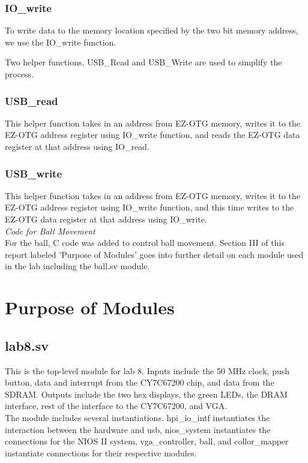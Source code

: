 \documentclass[journal, twocolumn, final,11pt,letterpaper]{IEEEtran}
\begin{document}
\subsubsection{IO\_write}
To write data to the memory location specified by the two bit memory address, we use the IO\_write function.

Two helper functions, USB\_Read and USB\_Write are used to simplify the process.\\

\subsubsection{USB\_read}
This helper function takes in an address from EZ-OTG memory, writes it to the EZ-OTG address register using IO\_write function, and reads the EZ-OTG data register at that address using IO\_read.  \\

\subsubsection{USB\_write}
This helper function takes in an address from EZ-OTG memory, writes it to the EZ-OTG address register using IO\_write function, and this time writes to the EZ-OTG data register at that address using IO\_write. \\

\textit{Code for Ball Movement}\\
For the ball, C code was added to control ball movement.  Section III of this report labeled 'Purpose of Modules' goes into further detail on each module used in the lab including the ball.sv module.  
  

\section{Purpose of Modules}

\subsection{lab8.sv}
This is the top-level module for lab 8.  Inputs include the 50 MHz clock, push button, data and interrupt from the CY7C67200 chip, and data from the SDRAM.  Outputs include the two hex displays, the green LEDs, the DRAM interface, rest of the interface to the CY7C67200, and VGA.  \\

The module includes several instantiations.  hpi\_io\_intf instantiates the interaction between the hardware and usb, nios\_system instantiates the connections for the NIOS II system, vga\_controller, ball, and collor\_mapper instantiate connections for their respective modules.
\end{document}
